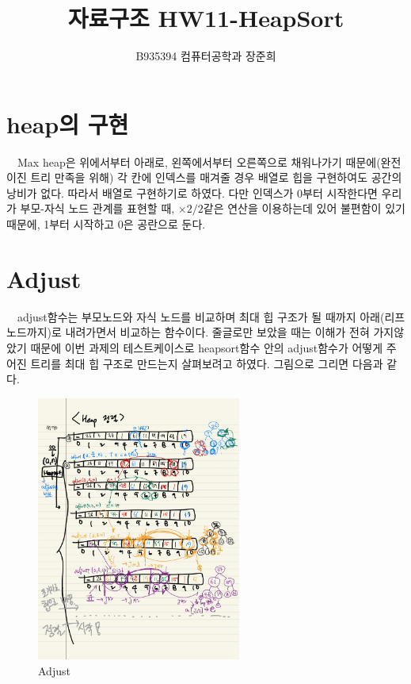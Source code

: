 \documentclass[a4paper,11pt]{article}
\begin{document}
\title{자료구조 HW11-HeapSort}
\author{B935394 컴퓨터공학과 장준희}
\maketitle
\newpage
\section{heap의 구현}
\ \ Max heap은 위에서부터 아래로, 왼쪽에서부터 오른쪽으로 채워나가기 때문에(완전 이진 트리 만족을 위해) 각 칸에 인덱스를 매겨줄 경우 배열로 힙을 구현하여도 공간의 낭비가 없다. 따라서 배열로 구현하기로 하였다. 다만 인덱스가 0부터 시작한다면 우리가 부모-자식 노드 관계를 표현할 때, $\times 2 /2$같은 연산을 이용하는데 있어 불편함이 있기 때문에, 1부터 시작하고 0은 공란으로 둔다.
\section{Adjust}
\ \ adjust함수는 부모노드와 자식 노드를 비교하며 최대 힙 구조가 될 때까지 아래(리프노드까지)로 내려가면서 비교하는 함수이다. 줄글로만 보았을 때는 이해가 전혀 가지않았기 때문에 이번 과제의 테스트케이스로 heapsort함수 안의 adjust함수가 어떻게 주어진 트리를 최대 힙 구조로 만드는지 살펴보려고 하였다. 그림으로 그리면 다음과 같다.
\begin{figure}[h]
\begin{center}
\includegraphics[width=0.6\textwidth]{heapsort}
\caption{Adjust}
\label{fig:fig1}
\end{center}
\end{figure}
\end{document}
